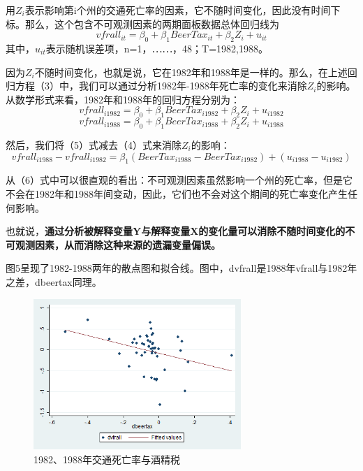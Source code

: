 \documentclass[cn,10pt,math=newtx,citestyle=gb7714-2015,bibstyle=gb7714-2015]{elegantbook}
\begin{document}
用$Z_i$表示影响第i个州的交通死亡率的因素，它不随时间变化，因此没有时间下标。那么，这个包含不可观测因素的两期面板数据总体回归线为
\begin{equation}
	vfrall_{it}=\beta_{0}+\beta_{1}BeerTax_{it}+\beta_{2}Z_i+u_{it}
\end{equation}
其中，$u_{it}$表示随机误差项，n=1，⋯⋯，48；T=1982,1988。

因为$Z_i$不随时间变化，也就是说，它在1982年和1988年是一样的。那么，在上述回归方程（3）中，我们可以通过分析1982年-1988年死亡率的变化来消除$Z_i$的影响。从数学形式来看，1982年和1988年的回归方程分别为：
\begin{equation}
	vfrall_{i1982}=\beta_{0}+\beta_{1}BeerTax_{i1982}+\beta_{2}Z_i+u_{i1982}
\end{equation}
\begin{equation}
	vfrall_{i1988}=\beta_{0}+\beta_{1}BeerTax_{i1988}+\beta_{2}Z_i+u_{i1988}
\end{equation}

然后，我们将（5）式减去（4）式来消除$Z_i$的影响：
\begin{equation}
	vfrall_{i1988}-vfrall_{i1982}=\beta_{1}(BeerTax_{i1988}-BeerTax_{i1982})+(u_{i1988}-u_{i1982})
\end{equation}

从（6）式中可以很直观的看出：不可观测因素虽然影响一个州的死亡率，但是它不会在1982年和1988年间变动，因此，它们也不会对这个期间的死亡率变化产生任何影响。

也就说，\textbf{通过分析被解释变量Y与解释变量X的变化量可以消除不随时间变化的不可观测因素，从而消除这种来源的遗漏变量偏误。}

图5呈现了1982-1988两年的散点图和拟合线。图中，dvfrall是1988年vfrall与1982年之差，dbeertax同理。
\begin{figure}[htbp]
	\centering
	\includegraphics[width=0.7\textwidth]{8288.png}
	\caption{1982、1988年交通死亡率与酒精税}\label{fig:digit}
\end{figure}
\end{document}
